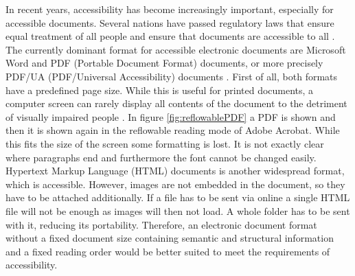 In recent years, accessibility has become increasingly important, especially for accessible documents. Several nations have passed regulatory laws that ensure equal treatment of all people and ensure that documents are accessible to all \cite{webaim}.\\
The currently dominant format for accessible electronic documents are Microsoft Word and PDF (Portable Document Format) documents, or more precisely PDF/UA (PDF/Universal Accessibility) documents \cite{pdfua}. First of all, both formats have a predefined page size. While this is useful for printed documents, a computer screen can rarely display all contents of the document to the detriment of visually impaired people \cite{EPUBzone}. In figure \ref{fig:reflowablePDF} a PDF is shown and then it is shown again in the reflowable reading mode of Adobe Acrobat. While this fits the size of the screen some formatting is lost. It is not exactly clear where paragraphs end and furthermore the font cannot be changed easily. Hypertext Markup Language (HTML) documents is another widespread format, which is accessible. However, images are not embedded in the document, so they have to be attached additionally. If a file has to be sent via online a single HTML file will not be enough as images will then not load. A whole folder has to be sent with it, reducing its portability.
Therefore, an electronic document format without a fixed document size containing semantic and structural information and a fixed reading order would be better suited to meet the requirements of accessibility.


